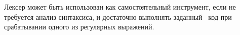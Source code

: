 \label{lexer}\secdown



\secdown

Лексер может быть использован как самостоятельный инструмент, если
не требуется анализ синтаксиса, и достаточно выполнять заданный \cpp\ код
при срабатывании одного из регулярных выражений.



\secup
\secup